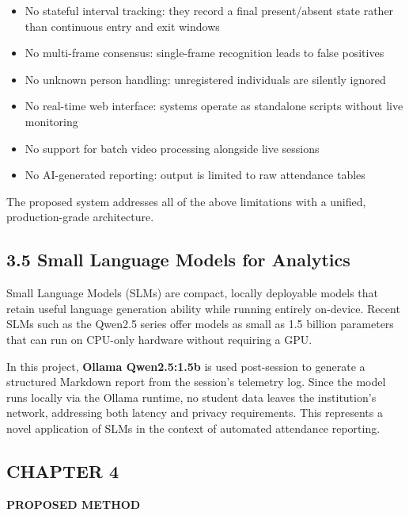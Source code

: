 \documentclass{report}
\begin{document}
\begin{itemize}
    \item No stateful interval tracking: they record a final present/absent state rather than continuous\vspace{3pt} entry and exit windows
    \item No multi-frame consensus: single-frame recognition leads to false positives
    \item No unknown person handling: unregistered individuals are silently ignored
    \item No real-time web interface: systems operate as standalone scripts without live monitoring
    \item No support for batch video processing alongside live sessions
    \item No AI-generated reporting: output is limited to raw attendance tables
\end{itemize}

The proposed system addresses all of the above limitations with a unified, production-grade\vspace{3pt} architecture.

\subsection*{3.5 Small Language Models for Analytics}


Small Language Models (SLMs) are compact, locally deployable models that retain useful language\vspace{3pt} generation ability while running entirely on-device. Recent SLMs such as the Qwen2.5 series offer\vspace{3pt} models as small as 1.5 billion parameters that can run on CPU-only hardware without requiring a GPU.

In this project, \textbf{Ollama Qwen2.5:1.5b} is used post-session to generate a structured Markdown report\vspace{3pt} from the session's telemetry log. Since the model runs locally via the Ollama runtime, no student\vspace{3pt} data leaves the institution's network, addressing both latency and privacy requirements. This represents\vspace{3pt} a novel application of SLMs in the context of automated attendance reporting.

\newpage
\begin{center}
    \section*{\textbf{CHAPTER 4}}
\end{center}
\begin{center}
    \textbf{\Large PROPOSED METHOD}\\[20pt]
\end{center}
\end{document}
